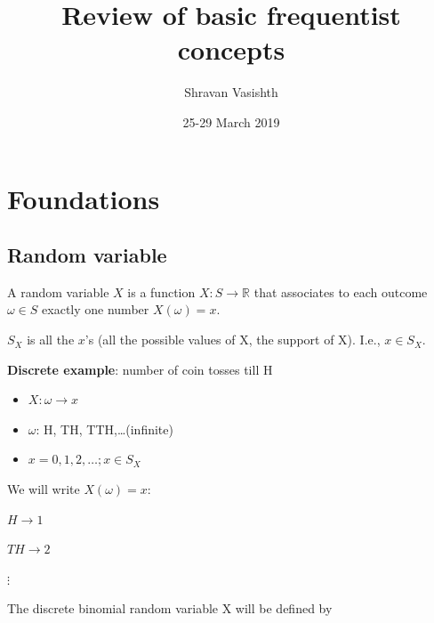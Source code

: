 \documentclass[12pt]{article}
\title{Review of basic frequentist concepts}
\author{Shravan Vasishth}
\date{25-29 March 2019}                                           %
\begin{document}
\maketitle

\section{Foundations}

\subsection{Random variable}

A random variable $X$ is a function $X : S \rightarrow \mathbb{R}$ that associates to each outcome
$\omega \in S$ exactly one number $X(\omega) = x$.

$S_X$ is all the $x$'s (all the possible values of X, the support of X). I.e., $x \in S_X$. 

\textbf{Discrete example}: number of coin tosses till H

\begin{itemize}
  \item $X: \omega \rightarrow x$
  \item $\omega$: H, TH, TTH,\dots (infinite)
  \item $x=0,1,2,\dots; x \in S_X$
\end{itemize}

We will write $X(\omega)=x$:

$H \rightarrow 1$\newline

$TH \rightarrow 2$\newline

$\vdots$





The discrete binomial random variable X will be defined by
\end{document}
